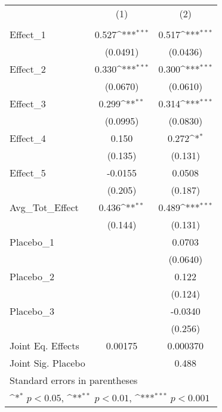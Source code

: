 \documentclass[varwidth]{standalone}
\begin{document}
{
\def\sym#1{\ifmmode^{#1}\else\(^{#1}\)\fi}
\begin{tabular}{l*{2}{c}}
\toprule
            &\multicolumn{1}{c}{(1)}&\multicolumn{1}{c}{(2)}\\
            &\multicolumn{1}{c}{} &\multicolumn{1}{c}{} \\
\midrule
Effect\_1    &       0.527\sym{***}&       0.517\sym{***}\\
            &    (0.0491)         &    (0.0436)         \\
\addlinespace
Effect\_2    &       0.330\sym{***}&       0.300\sym{***}\\
            &    (0.0670)         &    (0.0610)         \\
\addlinespace
Effect\_3    &       0.299\sym{**} &       0.314\sym{***}\\
            &    (0.0995)         &    (0.0830)         \\
\addlinespace
Effect\_4    &       0.150         &       0.272\sym{*}  \\
            &     (0.135)         &     (0.131)         \\
\addlinespace
Effect\_5    &     -0.0155         &      0.0508         \\
            &     (0.205)         &     (0.187)         \\
\addlinespace
Avg\_Tot\_Effect&       0.436\sym{**} &       0.489\sym{***}\\
            &     (0.144)         &     (0.131)         \\
\addlinespace
Placebo\_1   &                     &      0.0703         \\
            &                     &    (0.0640)         \\
\addlinespace
Placebo\_2   &                     &       0.122         \\
            &                     &     (0.124)         \\
\addlinespace
Placebo\_3   &                     &     -0.0340         \\
            &                     &     (0.256)         \\
\midrule
Joint Eq. Effects&     0.00175         &    0.000370         \\
Joint Sig. Placebo&                     &       0.488         \\
\bottomrule
\multicolumn{3}{l}{\footnotesize Standard errors in parentheses}\\
\multicolumn{3}{l}{\footnotesize \sym{*} \(p<0.05\), \sym{**} \(p<0.01\), \sym{***} \(p<0.001\)}\\
\end{tabular}
}
\end{document}
